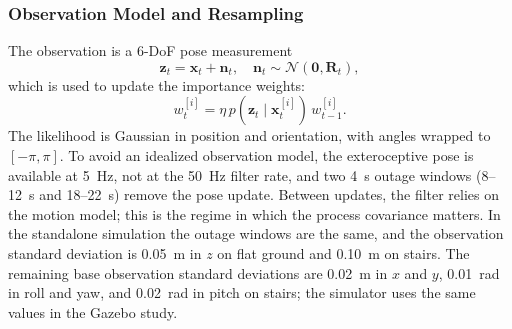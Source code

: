 \documentclass[final,3p,times]{elsarticle}
\begin{document}
\begin{table}[t]
    \centering
    \caption{Process-noise standard deviations used in \eqref{eq:qct}. Positions are in metres and angles in radians. The diagonal variance is the sum of the squared base and class-specific standard deviations.}
    \label{tab:process_noise}
\end{table}

\subsubsection{Observation Model and Resampling}
The observation is a 6-DoF pose measurement
\begin{equation}
    \mathbf{z}_t = \mathbf{x}_t + \mathbf{n}_t,
    \quad \mathbf{n}_t \sim \mathcal{N}(\mathbf{0},\mathbf{R}_t),
    \label{eq:obs}
\end{equation}
which is used to update the importance weights:
\begin{equation}
    w^{[i]}_t = \eta\, p(\mathbf{z}_t\mid\mathbf{x}^{[i]}_t)\,w^{[i]}_{t-1}.
    \label{eq:weight}
\end{equation}
The likelihood is Gaussian in position and orientation, with angles wrapped to $[-\pi,\pi]$. To avoid an idealized observation model, the exteroceptive pose is available at 5~Hz, not at the 50~Hz filter rate, and two 4~s outage windows (8--12~s and 18--22~s) remove the pose update. Between updates, the filter relies on the motion model; this is the regime in which the process covariance matters. In the standalone simulation the outage windows are the same, and the observation standard deviation is 0.05~m in $z$ on flat ground and 0.10~m on stairs. The remaining base observation standard deviations are 0.02~m in $x$ and $y$, 0.01~rad in roll and yaw, and 0.02~rad in pitch on stairs; the simulator uses the same values in the Gazebo study.
\end{document}
